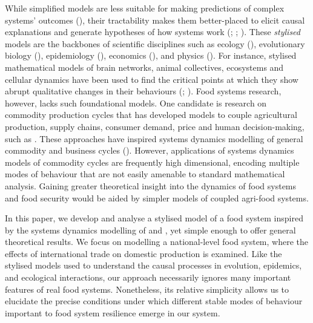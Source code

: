 \documentclass[12pt]{article}
\begin{document}
While simplified models are less suitable for making predictions of complex systems' outcomes (\cite{suweis2015}), their tractability makes them better-placed to elicit causal explanations and generate hypotheses of how systems work (\cite{smaldino2017}; \cite{smaldino2019}; \cite{otto2020}). These \textit{stylised} models are the backbones of scientific disciplines such as ecology (\cite{may1973}), evolutionary biology (\cite{boyd2003}), epidemiology (\cite{kermack1927}), economics (\cite{nerlove1958}), and physics (\cite{strogatz1994}). For instance, stylised mathematical models of brain networks, animal collectives, ecosystems and cellular dynamics have been used to find the critical points at which they show abrupt qualitative changes in their behaviours (\cite{sole1996}; \cite{scheffer2001}). Food systems research, however, lacks such foundational models. One candidate is research on commodity production cycles that has developed models to couple agricultural production, supply chains, consumer demand, price and human decision-making, such as \textcite{meadows1971}. These approaches have inspired systems dynamics modelling of general commodity and business cycles (\cite{sterman2000}). However, applications of systems dynamics models of commodity cycles are frequently high dimensional, encoding multiple modes of behaviour that are not easily amenable to standard mathematical analysis. Gaining greater theoretical insight into the dynamics of food systems and food security would be aided by simpler models of coupled agri-food systems.

In this paper, we develop and analyse a stylised model of a food system inspired by the systems dynamics modelling of \textcite{meadows1971} and \textcite{sterman2000}, yet simple enough to offer general theoretical results. We focus on modelling a national-level food system, where the effects of international trade on domestic production is examined. Like the stylised models used to understand the causal processes in evolution, epidemics, and ecological interactions, our approach necessarily ignores many important features of real food systems. Nonetheless, its relative simplicity allows us to elucidate the precise conditions under which different stable modes of behaviour important to food system resilience emerge in our system.
\end{document}
